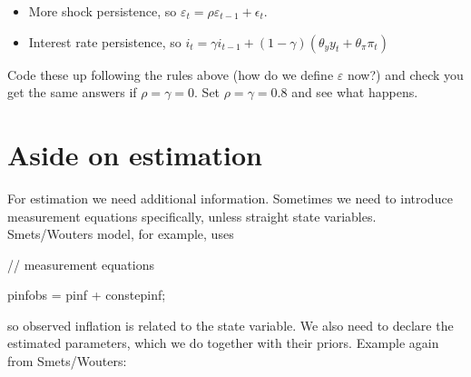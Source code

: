 \documentclass[
  letterpaper,
]{book}
\newenvironment{Shaded}{\begin{snugshade}}{\end{snugshade}}
\newcommand{\OperatorTok}[1]{\textcolor[rgb]{0.37,0.37,0.37}{#1}}
\newcommand{\VariableTok}[1]{\textcolor[rgb]{0.07,0.07,0.07}{#1}}
\providecommand{\tightlist}{%
  \setlength{\itemsep}{0pt}\setlength{\parskip}{0pt}}\usepackage{longtable,booktabs,array}
\begin{document}
\begin{itemize}
\tightlist
\item
  More shock persistence, so
  \(\varepsilon_t = \rho\varepsilon_{t-1} + \epsilon_t\).
\item
  Interest rate persistence, so
  \(i_t=\gamma i_{t-1}+(1-\gamma ) (\theta_y y_t + \theta_{\pi}\pi_t)\)
\end{itemize}

Code these up following the rules above (how do we define
\(\varepsilon\) now?) and check you get the same answers if
\(\rho =\gamma =0\). Set \(\rho =\gamma =0.8\) and see what happens.

\hypertarget{aside-on-estimation}{%
\section{Aside on estimation}\label{aside-on-estimation}}

For estimation we need additional information. Sometimes we need to
introduce measurement equations specifically, unless straight state
variables. Smets/Wouters model, for example, uses

\begin{Shaded}
\begin{Highlighting}[]
\OperatorTok{//} \VariableTok{measurement} \VariableTok{equations}

\VariableTok{pinfobs} \OperatorTok{=} \VariableTok{pinf} \OperatorTok{+} \VariableTok{constepinf}\OperatorTok{;}
\end{Highlighting}
\end{Shaded}

so observed inflation is related to the state variable. We also need to
declare the estimated parameters, which we do together with their
priors. Example again from Smets/Wouters:
\end{document}
